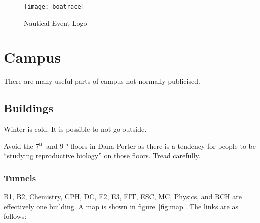 \documentclass{book}
\begin{document}
\begin{figure}
\begin{center}
\texttt{[image: boatrace]}
\end{center}
\caption{\label{fig:boatrace}Nautical Event Logo}
\end{figure}

\chapter{Campus}
There are many useful parts of campus not normally publicised.

\section{Buildings}
Winter is cold. It is possible to not go outside.

Avoid the 7$^{\mathrm{th}}$ and 9$^{\mathrm{th}}$ floors in Dana Porter as there is a tendency for people to be ``studying reproductive biology'' on those floors. Tread carefully.

\subsection{Tunnels}
B1, B2, Chemistry, CPH, DC, E2, E3, EIT, ESC, MC, Physics, and RCH are effectively one building. A map is shown in figure~\ref{fig:map}. The links are as follows: 
\end{document}
